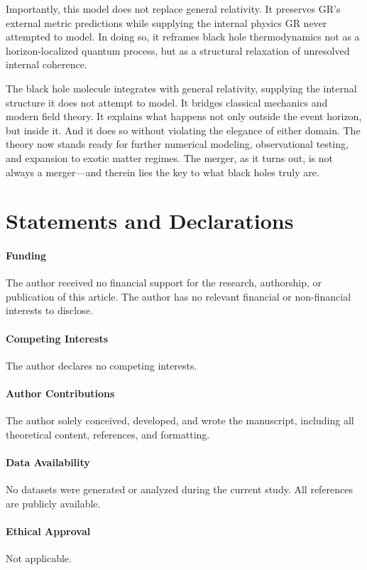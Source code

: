 \documentclass[sn-mathphys]{sn-jnl}
\theoremstyle{thmstyleone}%
\theoremstyle{thmstyletwo}%
\theoremstyle{thmstylethree}%
\begin{document}
Importantly, this model does not replace general relativity. It preserves GR’s external metric predictions while supplying the internal physics GR never attempted to model. In doing so, it reframes black hole thermodynamics not as a horizon-localized quantum process, but as a structural relaxation of unresolved internal coherence.

The black hole molecule integrates with general relativity, supplying the internal structure it does not attempt to model. It bridges classical mechanics and modern field theory. It explains what happens not only outside the event horizon, but inside it. And it does so without violating the elegance of either domain. The theory now stands ready for further numerical modeling, observational testing, and expansion to exotic matter regimes. The merger, as it turns out, is not always a merger—and therein lies the key to what black holes truly are.

\section*{Statements and Declarations}

\paragraph*{Funding}
The author received no financial support for the research, authorship, or publication of this article.
The author has no relevant financial or non-financial interests to disclose.

\paragraph*{Competing Interests}
The author declares no competing interests.

\paragraph*{Author Contributions}
The author solely conceived, developed, and wrote the manuscript, including all theoretical content, references, and formatting.

\paragraph*{Data Availability}
No datasets were generated or analyzed during the current study. All references are publicly available.

\paragraph*{Ethical Approval}
Not applicable.
\end{document}
